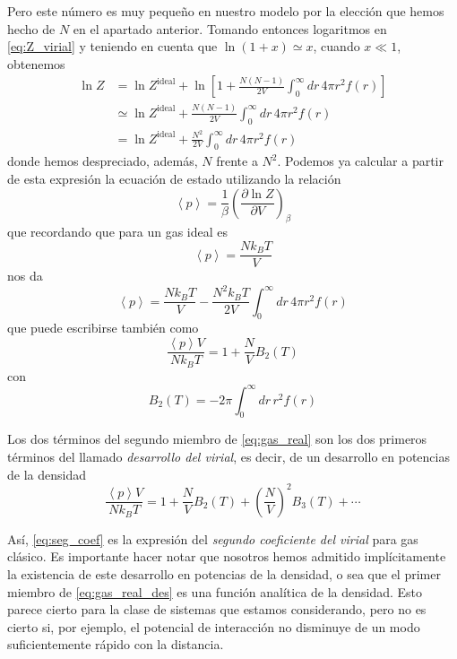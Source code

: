 Pero este número es muy pequeño en nuestro modelo por la elección que hemos hecho de $N$ en el apartado anterior. Tomando entonces logaritmos en \eqref{eq:Z_virial} y teniendo en cuenta que $\ln(1 + x) \simeq x$, cuando $x \ll 1$, obtenemos
\begin{align}
	\ln Z &= \ln Z^\text{ideal} + \ln \left[ 1 + \frac{N(N-1)}{2V} \int_0^{\infty} dr \, 4 \pi r^2 f(r) \right] \nonumber \\
		&\simeq \ln Z^\text{ideal} + \frac{N(N-1)}{2V} \int_0^{\infty} dr \, 4 \pi r^2 f(r) \\
		&=  \ln Z^\text{ideal} + \frac{N^2}{2V} \int_0^{\infty} dr \, 4 \pi r^2 f(r) \nonumber
\end{align}
donde hemos despreciado, además, $N$ frente a $N^2$.
Podemos ya calcular a partir de esta expresión la ecuación de estado utilizando la relación
\begin{equation}
	\left\langle p \right\rangle = \frac{1}{\beta} \left( \frac{\partial \ln Z}{\partial V}\right)_{\beta}
\end{equation}
que recordando que para un gas ideal es
\begin{equation}
	\left\langle p \right\rangle = \frac{N k_B T}{V}
\end{equation}
nos da
\begin{equation}
	\left\langle p \right\rangle = \frac{N k_B T}{V} - \frac{N^2 k_B T}{2V} \int_0^{\infty} dr \, 4 \pi r^2 f(r)
\end{equation}
que puede escribirse también como
\begin{equation}\label{eq:gas_real}
	\frac{\left\langle p \right\rangle V}{N k_B T} = 1 + \frac{N}{V} B_2(T)
\end{equation}
con
\begin{equation}\label{eq:seg_coef}
	B_2(T) = -2\pi \int_0^{\infty} dr \, r^2 f(r)
\end{equation}

Los dos términos del segundo miembro de \eqref{eq:gas_real} son los dos primeros términos del llamado \emph{desarrollo del virial}, es decir, de un desarrollo en potencias de la densidad
\begin{equation}\label{eq:gas_real_des}
	\frac{\left\langle p \right\rangle V}{N k_B T} = 1 + \frac{N}{V} B_2(T) + \left( \frac{N}{V} \right)^2 B_3(T) + \cdots
\end{equation}

Así, \eqref{eq:seg_coef} es la expresión del \emph{segundo coeficiente del virial} para gas clásico.
Es importante hacer notar que nosotros hemos admitido implícitamente la existencia de este desarrollo en potencias de la densidad, o sea que el primer miembro de \eqref{eq:gas_real_des} es una función analítica de la densidad.
Esto parece cierto para la clase de sistemas que estamos considerando, pero no es cierto si, por ejemplo, el potencial de interacción no disminuye de un modo suficientemente rápido con la distancia.

